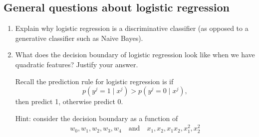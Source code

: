 \newpage
\subsection{General questions about logistic regression }

\begin{enumerate}

\item %
Explain why logistic regression is a discriminative classifier (as opposed to a generative classifier such as Naive Bayes).

\begin{tcolorbox}[fit,height=7cm, width=0.9\textwidth, blank,     borderline={1pt}{-2pt},nobeforeafter]
\end{tcolorbox}

\item %
What does the decision boundary of logistic regression look like when we have quadratic features? Justify your answer.

Recall the prediction rule for logistic regression is if 
$$p(y^j=1\mid x^j)>p(y^j=0\mid x^j),$$
then predict 1, otherwise predict 0.

Hint: consider the decision boundary as a function of
\begin{gather*}
    w_0,w_1,w_2,w_3,w_4\quad\text{and}\quad x_1,x_2,x_1x_2,x_1^2,x_2^2    
\end{gather*}
\begin{tcolorbox}[fit,height=7cm, width=0.9\textwidth, blank,     borderline={1pt}{-2pt},nobeforeafter]
    \end{tcolorbox}
\end{enumerate}
